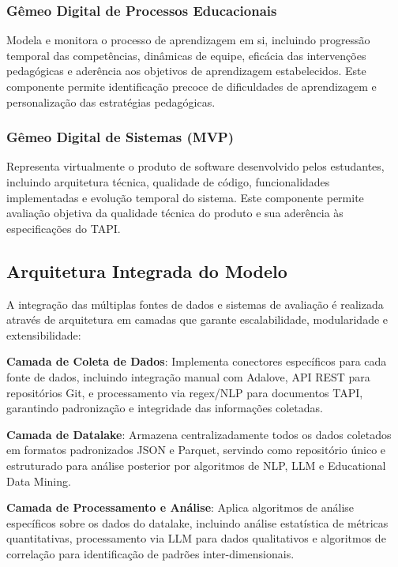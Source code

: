 \documentclass[12pt, a4paper, oneside, brazilian]{abntex2}
\begin{document}
\subsubsection{Gêmeo Digital de Processos Educacionais}

Modela e monitora o processo de aprendizagem em si, incluindo progressão temporal das competências, dinâmicas de equipe, eficácia das intervenções pedagógicas e aderência aos objetivos de aprendizagem estabelecidos. Este componente permite identificação precoce de dificuldades de aprendizagem e personalização das estratégias pedagógicas.

\subsubsection{Gêmeo Digital de Sistemas (MVP)}

Representa virtualmente o produto de software desenvolvido pelos estudantes, incluindo arquitetura técnica, qualidade de código, funcionalidades implementadas e evolução temporal do sistema. Este componente permite avaliação objetiva da qualidade técnica do produto e sua aderência às especificações do TAPI.

\subsection{Arquitetura Integrada do Modelo}

A integração das múltiplas fontes de dados e sistemas de avaliação é realizada através de arquitetura em camadas que garante escalabilidade, modularidade e extensibilidade:

\textbf{Camada de Coleta de Dados}: Implementa conectores específicos para cada fonte de dados, incluindo integração manual com Adalove, API REST para repositórios Git, e processamento via regex/NLP para documentos TAPI, garantindo padronização e integridade das informações coletadas.

\textbf{Camada de Datalake}: Armazena centralizadamente todos os dados coletados em formatos padronizados JSON e Parquet, servindo como repositório único e estruturado para análise posterior por algoritmos de NLP, LLM e Educational Data Mining.

\textbf{Camada de Processamento e Análise}: Aplica algoritmos de análise específicos sobre os dados do datalake, incluindo análise estatística de métricas quantitativas, processamento via LLM para dados qualitativos e algoritmos de correlação para identificação de padrões inter-dimensionais.
\end{document}
